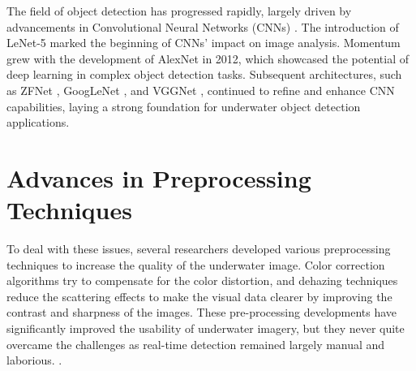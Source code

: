 The field of object detection has progressed rapidly, largely driven by advancements in Convolutional Neural Networks (CNNs) \cite{chatterjee2018evolution}. The introduction of LeNet-5 \cite{lecun1998gradient} marked the beginning of CNNs' impact on image analysis. Momentum grew with the development of AlexNet \cite{krizhevsky2017imagenet} in 2012, which showcased the potential of deep learning in complex object detection tasks. Subsequent architectures, such as ZFNet \cite{zeiler2014visualizing}, GoogLeNet \cite{szegedy2015going}, and VGGNet \cite{simonyan2015very}, continued to refine and enhance CNN capabilities, laying a strong foundation for underwater object detection applications.

\section{Advances in Preprocessing Techniques}
To deal with these issues, several researchers developed various preprocessing techniques to increase the quality of the underwater image. Color correction algorithms try to compensate for the color distortion, and dehazing techniques reduce the scattering effects to make the visual data clearer by improving the contrast and sharpness of the images. These pre-processing developments have significantly improved the usability of underwater imagery, but they never quite overcame the challenges as real-time detection remained largely manual and laborious. \cite{ancuti2018color}.
